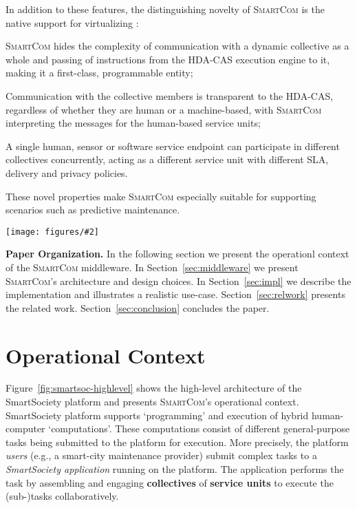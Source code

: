 \documentclass{llncs}
\newcommand{\mdl}{\textsc{SmartCom}}
\newcommand{\figtop}[3][0.9]{
\begin{figure*}[h]
\centering
\texttt{[image: figures/\#2]}
\caption{#3}
\label{fig:#2}
\end{figure*}
}
\begin{document}
	In addition to these features, the distinguishing novelty of \mdl{} is the native support for virtualizing : 
	\begin{inparaenum}[i) \itshape]
	\item
	\mdl{} hides the complexity of communication with a dynamic collective as a whole and passing of instructions from the HDA-CAS execution engine to it, making it a first-class, programmable entity; 
	\item 
	Communication with the collective members is transparent to the HDA-CAS, regardless of whether they are human or a machine-based, with \mdl{} interpreting the messages for the human-based service units; 
	\item 
	A single human, sensor or software service endpoint can participate in different collectives concurrently, acting as a different service unit with different SLA, delivery and privacy policies. 
	\end{inparaenum}
	These novel properties make \mdl{} especially suitable for supporting scenarios such as predictive maintenance.


\figtop[.85]{smartsoc-highlevel}{Operational context for the \mdl{} middleware. Middleware components are marked in blue.}


\textbf{Paper Organization. }
  In the following section we present the operationl context of the \mdl{} middleware. In Section~\ref{sec:middleware} we present \mdl's architecture and design choices. In Section~\ref{sec:impl} we  describe the implementation and illustrates a realistic use-case. Section~\ref{sec:relwork} presents the related work. Section~\ref{sec:conclusion} concludes the paper.


  \section{Operational Context}
    \label{sec:intro:context}

      Figure~\ref{fig:smartsoc-highlevel} shows the high-level architecture of the SmartSociety platform and presents \mdl's operational context. SmartSociety platform supports `programming' and execution of hybrid human-computer `computations'. These computations consist of different general-purpose tasks being submitted to the platform for execution. More precisely, the platform \emph{users} (e.g., a smart-city maintenance provider) submit complex tasks to a \emph{SmartSociety application} running on the platform. The application performs the task by assembling and engaging \textbf{collectives} of \textbf{service units} to execute the (sub-)tasks collaboratively.
\end{document}
